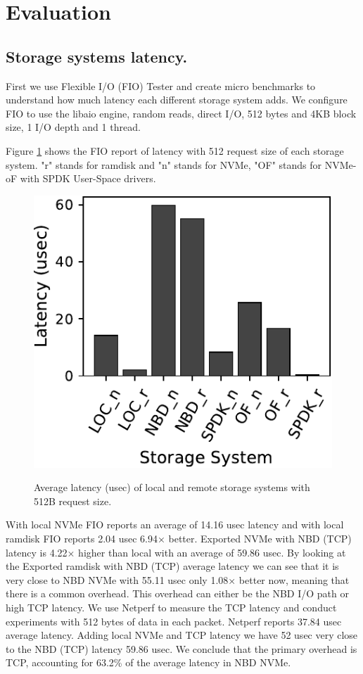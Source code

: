 \section{Evaluation}
\subsection{Storage systems latency.}
\par First we use Flexible I/O (FIO) Tester and create micro benchmarks to understand how much latency each different storage system adds. We configure FIO to use the libaio engine, random reads, direct I/O, 512 bytes and 4KB block size, 1 I/O depth and 1 thread.
\par Figure \ref{fig:fio_512} shows the FIO report of latency with 512 request size of each storage system. "r" stands for ramdisk and "n" stands for NVMe, "OF" stands for NVMe-oF with SPDK User-Space drivers.
\begin{figure}[H]
  \includegraphics[width=\linewidth]{figures/fio_512.pdf}\\
\caption{Average latency (usec) of local and remote storage systems with 512B request size.}
\label{fig:fio_512}
\end{figure}
With local NVMe FIO reports an average of 14.16 usec latency and with local ramdisk FIO reports 2.04 usec 6.94× better. Exported NVMe with NBD (TCP) latency is 4.22× higher than local with an average of 59.86 usec. By looking at the Exported ramdisk with NBD (TCP) average latency we can see that it is very close to NBD NVMe with 55.11 usec only 1.08× better now, meaning that there is a common overhead. This overhead can either be the NBD I/O path or high TCP latency. We use Netperf to measure the TCP latency and conduct experiments with 512 bytes of data in each packet. Netperf reports 37.84 usec average latency. Adding local NVMe and TCP latency we have 52 usec very close to the NBD (TCP) latency 59.86 usec. We conclude that the primary overhead is TCP, accounting for 63.2\% of the average latency in NBD NVMe.
